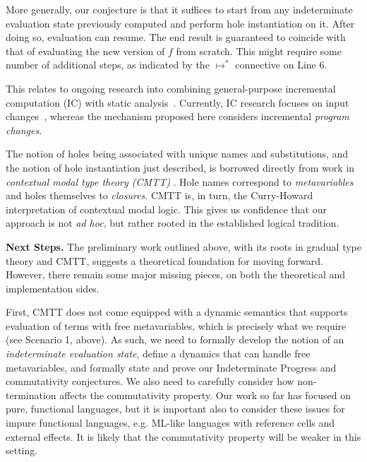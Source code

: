 More generally, our conjecture is that it suffices to start from any indeterminate evaluation 
state previously computed and perform hole instantiation on it. After doing so, evaluation can resume. The end result is guaranteed to coincide with that of evaluating the new version of $f$ from scratch. This might require some number of additional steps, as indicated by the $\mapsto^{*}$ connective on Line 6.





This relates to 
ongoing research into combining general-purpose incremental
computation (IC) with static analysis~\cite{OVV2016}. 
%
Currently, IC research focuses on input
changes~\citep{TypedAdapton2016, Fisher2016, Hammer2015, Chen2014,
Hammer2014, Chen2011, Hammer2011, Hammer2009, Hammer2008}, whereas the
mechanism proposed here considers incremental \emph{program changes}.

The notion of holes being associated with unique names and substitutions, and the notion of hole instantiation just described, is borrowed directly from work in \emph{contextual modal type theory (CMTT)} \cite{Nanevski2008}. Hole names correspond to \emph{metavariables} and holes themselves to \emph{closures}. CMTT is, in turn, the Curry-Howard interpretation of contextual modal logic. This gives us confidence that our approach is not \emph{ad hoc}, but rather rooted in the established logical tradition.

\vspace{1ex}
\noindent\textbf{Next Steps.} The preliminary work outlined above, with its roots in gradual type theory and CMTT, suggests a theoretical foundation for moving forward. However, there remain some major missing pieces, on both the theoretical and implementation sides.

First, CMTT does not come equipped with a dynamic semantics that supports evaluation of terms with free metavariables, which is precisely what we require (see Scenario 1, above). As such, we need to formally develop the notion of an \emph{indeterminate evaluation state}, define a dynamics that can handle free metavariables, and formally state and prove our Indeterminate Progress and commutativity conjectures. We also need to carefully consider how non-termination affects the commutativity property. Our work so far has focused on pure, functional languages, but it is important also to consider these issues for impure functional languages, e.g. ML-like languages with reference cells and external effects. It is likely that the commutativity property will be weaker in this setting.

